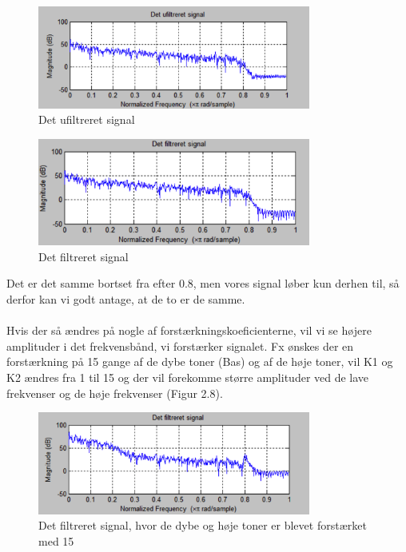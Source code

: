 \begin{figure}[H]
	\centering
	\includegraphics[width=0.8\textwidth]{Figur/Snip20151111_68}
	\caption{Det ufiltreret signal}
\end{figure}

\begin{figure}[H]
	\centering
	\includegraphics[width=0.8\textwidth]{Figur/Snip20151111_69}
	\caption{Det filtreret signal}
\end{figure}

Det er det samme bortset fra efter 0.8, men vores signal løber kun derhen til, så derfor kan vi godt antage, at de to er de samme. 
\\ \\
Hvis der så ændres på nogle af forstærkningskoeficienterne, vil vi se højere amplituder i det frekvensbånd, vi forstærker signalet. 
Fx ønskes der en forstærkning på 15 gange af de dybe toner (Bas) og af de høje toner, vil K1 og K2 ændres fra 1 til 15 og der vil forekomme større amplituder ved de lave frekvenser og de høje frekvenser (Figur 2.8). 

\begin{figure}[H]
	\centering
	\includegraphics[width=0.8\textwidth]{Figur/Snip20151111_70}
	\caption{Det filtreret signal, hvor de dybe og høje toner er blevet forstærket med 15}
\end{figure}

